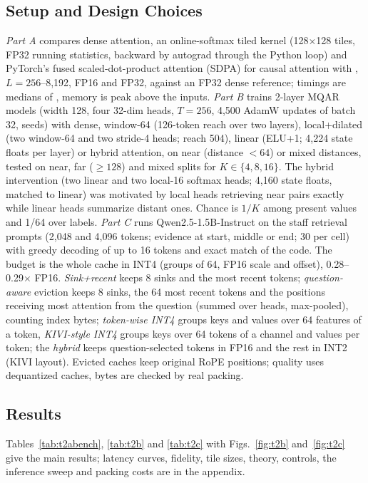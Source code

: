 \documentclass{article}
\begin{document}
\subsection{Setup and Design Choices}
\emph{Part A} compares dense attention, an online-softmax tiled kernel (128$\times$128 tiles, FP32 running statistics,
backward by autograd through the Python loop) and PyTorch's fused scaled-dot-product attention (SDPA) for causal
attention with \TTwoAShape, $L=256$--8,192, FP16 and FP32, against an FP32 dense reference; timings are medians of
\TTwoABenchReps, memory is peak above the inputs. \emph{Part B} trains 2-layer MQAR models (width 128, four 32-dim heads,
$T=256$, 4,500 AdamW updates of batch 32, \TTwoBSeeds{} seeds) with dense, window-64 (126-token reach over two layers),
local+dilated (two window-64 and two stride-4 heads; reach 504), linear (ELU+1; 4,224 state floats per layer) or hybrid
attention, on near (distance $<64$) or mixed distances, tested on near, far ($\ge128$) and mixed splits for
$K\in\{4,8,16\}$. The hybrid intervention (two linear and two local-16 softmax heads; 4,160 state floats, matched to linear)
was motivated by local heads retrieving near pairs exactly while linear heads summarize distant ones. Chance is $1/K$
among present values and 1/64 over labels. \emph{Part C} runs Qwen2.5-1.5B-Instruct on
the \TTwoCN{} staff retrieval prompts (2,048 and 4,096 tokens; evidence at start, middle or end; 30 per cell) with greedy
decoding of up to 16 tokens and exact match of the code. The budget is the whole cache in INT4 (groups of 64, FP16 scale
and offset), 0.28--0.29$\times$ FP16. \emph{Sink+recent} keeps 8 sinks and the most recent tokens; \emph{question-aware}
eviction keeps 8 sinks, the 64 most recent tokens and the positions receiving most attention from the question
(summed over heads, max-pooled), counting index bytes; \emph{token-wise INT4} groups keys and values over 64 features of a
token, \emph{KIVI-style INT4} groups keys over 64 tokens of a channel and values per token; the \emph{hybrid} keeps
question-selected tokens in FP16 and the rest in INT2 (KIVI layout). Evicted caches keep original RoPE positions; quality
uses dequantized caches, bytes are checked by real packing.

\subsection{Results}
Tables~\ref{tab:t2abench}, \ref{tab:t2b} and \ref{tab:t2c} with Figs.~\ref{fig:t2b} and~\ref{fig:t2c} give the main results;
latency curves, fidelity, tile sizes, theory, controls, the inference sweep and packing costs are in the appendix.
\end{document}
